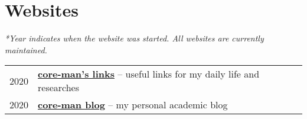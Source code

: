 \section*{Websites}

\textit{*Year indicates when the website was started. All websites are currently maintained.}

\begin{tabular}{p{} p{}}
2020 &	\textbf{\href{https://core-man.github.io/link/}{core-man's links}} -- useful links for my daily life and researches \\
2020 &	\textbf{\href{https://core-man.github.io/blog/}{core-man blog}} -- my personal academic blog \\
\end{tabular}
